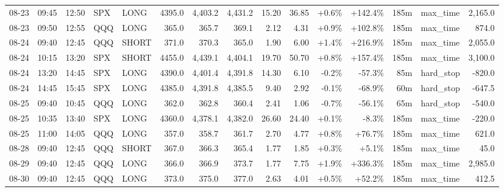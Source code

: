 \documentclass[11pt,a4paper,twoside]{article}
\begin{document}
\begin{landscape}
\begin{center}
\begin{longtable}{>{\color{txtmain}}l l l l l r r r r r r r r >{\color{txtmain}}l r}
08-23 & 09:45 & 12:50 & SPX & LONG & 4395.0 & 4,403.2 & 4,431.2 & 15.20 & 36.85 & \textcolor{wingreen}{+0.6\%} & \textcolor{wingreen}{+142.4\%} & 185m & max\_time & \textcolor{wingreen}{2,165.0} \\
08-23 & 09:50 & 12:55 & QQQ & LONG & 365.0 & 365.7 & 369.1 & 2.12 & 4.31 & \textcolor{wingreen}{+0.9\%} & \textcolor{wingreen}{+102.8\%} & 185m & max\_time & \textcolor{wingreen}{874.0} \\
08-24 & 09:40 & 12:45 & QQQ & SHORT & 371.0 & 370.3 & 365.0 & 1.90 & 6.00 & \textcolor{wingreen}{+1.4\%} & \textcolor{wingreen}{+216.9\%} & 185m & max\_time & \textcolor{wingreen}{2,055.0} \\
08-24 & 10:15 & 13:20 & SPX & SHORT & 4455.0 & 4,439.1 & 4,404.1 & 19.70 & 50.70 & \textcolor{wingreen}{+0.8\%} & \textcolor{wingreen}{+157.4\%} & 185m & max\_time & \textcolor{wingreen}{3,100.0} \\
08-24 & 13:20 & 14:45 & SPX & LONG & 4390.0 & 4,401.4 & 4,391.8 & 14.30 & 6.10 & \textcolor{lossred}{-0.2\%} & \textcolor{lossred}{-57.3\%} & 85m & hard\_stop & \textcolor{lossred}{-820.0} \\
08-24 & 14:45 & 15:45 & SPX & LONG & 4385.0 & 4,391.8 & 4,385.5 & 9.40 & 2.92 & \textcolor{lossred}{-0.1\%} & \textcolor{lossred}{-68.9\%} & 60m & hard\_stop & \textcolor{lossred}{-647.5} \\
08-25 & 09:40 & 10:45 & QQQ & LONG & 362.0 & 362.8 & 360.4 & 2.41 & 1.06 & \textcolor{lossred}{-0.7\%} & \textcolor{lossred}{-56.1\%} & 65m & hard\_stop & \textcolor{lossred}{-540.0} \\
08-25 & 10:35 & 13:40 & SPX & LONG & 4360.0 & 4,378.1 & 4,382.0 & 26.60 & 24.40 & \textcolor{wingreen}{+0.1\%} & \textcolor{lossred}{-8.3\%} & 185m & max\_time & \textcolor{lossred}{-220.0} \\
08-25 & 11:00 & 14:05 & QQQ & LONG & 357.0 & 358.7 & 361.7 & 2.70 & 4.77 & \textcolor{wingreen}{+0.8\%} & \textcolor{wingreen}{+76.7\%} & 185m & max\_time & \textcolor{wingreen}{621.0} \\
08-28 & 09:40 & 12:45 & QQQ & SHORT & 367.0 & 366.3 & 365.4 & 1.77 & 1.85 & \textcolor{wingreen}{+0.3\%} & \textcolor{wingreen}{+5.1\%} & 185m & max\_time & \textcolor{wingreen}{45.0} \\
08-29 & 09:40 & 12:45 & QQQ & LONG & 366.0 & 366.9 & 373.7 & 1.77 & 7.75 & \textcolor{wingreen}{+1.9\%} & \textcolor{wingreen}{+336.3\%} & 185m & max\_time & \textcolor{wingreen}{2,985.0} \\
08-30 & 09:40 & 12:45 & QQQ & LONG & 373.0 & 375.0 & 377.0 & 2.63 & 4.01 & \textcolor{wingreen}{+0.5\%} & \textcolor{wingreen}{+52.2\%} & 185m & max\_time & \textcolor{wingreen}{412.5} \\

\end{longtable}
\end{center}
\end{landscape}
\end{document}

